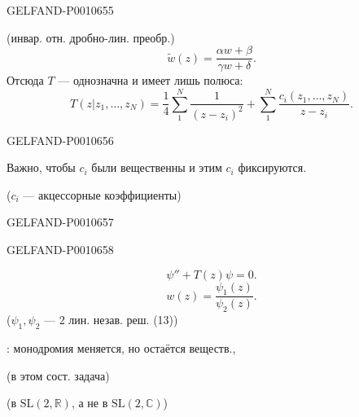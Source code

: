 \begin{GelfandAdjacentEvidence}{GELFAND-P001065}{5}

(инвар. отн. дробно-лин. преобр.)
\[
\widetilde w(z)=\frac{\alpha w+\beta}{\gamma w+\delta}.
\]
Отсюда \(T\) — однозначна и имеет лишь полюса:
\begin{equation*}
T(z|z_1,\ldots,z_N)=\frac14\sum_1^N\frac1{(z-z_i)^2}
 +\sum_1^N\frac{c_i(z_1,\ldots,z_N)}{z-z_i}.
\tag{11}
\end{equation*}
\end{GelfandAdjacentEvidence}
\begin{GelfandAdjacentEvidence}{GELFAND-P001065}{6}


Важно, чтобы \(c_i\) были вещественны и этим \(c_i\) фиксируются.

(\(c_i\) — акцессорные коэффициенты)
\end{GelfandAdjacentEvidence}
\begin{GelfandAdjacentEvidence}{GELFAND-P001065}{7}


\end{GelfandAdjacentEvidence}
\begin{GelfandAdjacentEvidence}{GELFAND-P001065}{8}

\begin{equation*}
\psi''+T(z)\psi=0.\tag{12}
\end{equation*}
\begin{equation*}
w(z)=\frac{\psi_1(z)}{\psi_2(z)}.\tag{13}
\end{equation*}
(\(\psi_1,\psi_2\) — 2 лин. незав. реш. (13))
\end{GelfandAdjacentEvidence}


: монодромия меняется, но остаётся веществ.,

(в этом сост. задача)

(в \(\mathrm{SL}(2,\mathbb R)\), а не в \(\mathrm{SL}(2,\mathbb C)\))


